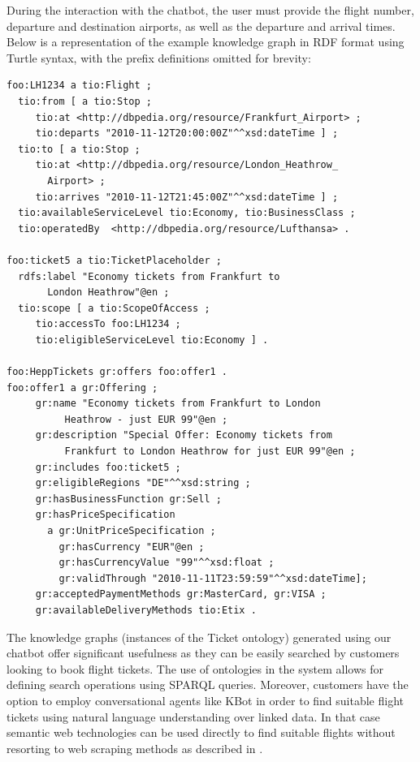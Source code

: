 \documentclass[runningheads]{llncs}
\begin{document}
\FloatBarrier
During the interaction with the chatbot, the user must provide the flight number, departure and destination airports, as well as the departure and arrival times.
Below is a representation of the example knowledge graph in RDF format using Turtle syntax, with the prefix definitions omitted for brevity:
\begin{lstlisting}[basicstyle=\small]
foo:LH1234 a tio:Flight ;
  tio:from [ a tio:Stop ;
     tio:at <http://dbpedia.org/resource/Frankfurt_Airport> ;
     tio:departs "2010-11-12T20:00:00Z"^^xsd:dateTime ] ;
  tio:to [ a tio:Stop ;
     tio:at <http://dbpedia.org/resource/London_Heathrow_
       Airport> ;
     tio:arrives "2010-11-12T21:45:00Z"^^xsd:dateTime ] ;
  tio:availableServiceLevel tio:Economy, tio:BusinessClass ;          
  tio:operatedBy  <http://dbpedia.org/resource/Lufthansa> .
            
foo:ticket5 a tio:TicketPlaceholder ;
  rdfs:label "Economy tickets from Frankfurt to
       London Heathrow"@en ;
  tio:scope [ a tio:ScopeOfAccess ;
     tio:accessTo foo:LH1234 ;
     tio:eligibleServiceLevel tio:Economy ] .

foo:HeppTickets gr:offers foo:offer1 .
foo:offer1 a gr:Offering ;
     gr:name "Economy tickets from Frankfurt to London
          Heathrow - just EUR 99"@en ;
     gr:description "Special Offer: Economy tickets from
          Frankfurt to London Heathrow for just EUR 99"@en ;
     gr:includes foo:ticket5 ;
     gr:eligibleRegions "DE"^^xsd:string ;
     gr:hasBusinessFunction gr:Sell ;
     gr:hasPriceSpecification
       a gr:UnitPriceSpecification ;
         gr:hasCurrency "EUR"@en ;
         gr:hasCurrencyValue "99"^^xsd:float ;
         gr:validThrough "2010-11-11T23:59:59"^^xsd:dateTime];
     gr:acceptedPaymentMethods gr:MasterCard, gr:VISA ;
     gr:availableDeliveryMethods tio:Etix .	
\end{lstlisting}
The knowledge graphs (instances of the Ticket ontology) generated using our chatbot offer significant usefulness as they can be easily searched by customers looking to book flight tickets. The use of ontologies in the system allows for defining search operations using SPARQL queries.
Moreover, customers have the option to employ conversational agents like KBot\cite{ait2020kbot} in order to find suitable flight tickets using natural language understanding over linked data. In that case semantic web technologies can be used directly to find suitable flights without resorting to web scraping methods as described in \cite{turnip2019application}.        
   
\end{document}
